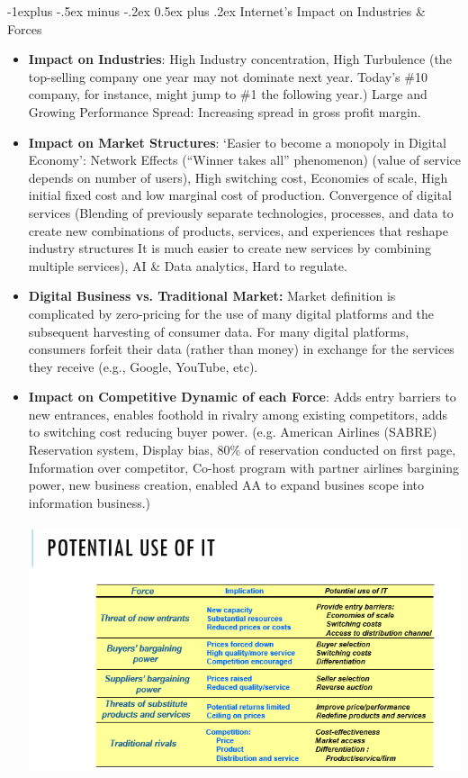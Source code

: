 \documentclass[12pt, landscape]{article}
\makeatletter
\renewcommand{\subsection}{\@startsection{subsection}{2}{0mm}%
                                {-1explus -.5ex minus -.2ex}%
                                {0.5ex plus .2ex}%
                                {\normalfont\normalsize\bfseries}}
\makeatother
\begin{document}
\begin{multicols*}{3}
\subsection{Internet's Impact on Industries \& Forces}
\begin{itemize}
\item \textbf{Impact on Industries}: High Industry concentration, High Turbulence (the top-selling company one year may not dominate next year. Today’s \#10 company, for instance, might jump to \#1 the following year.) Large and Growing Performance Spread: Increasing spread in gross profit margin.
\item \textbf{Impact on Market Structures}: `Easier to become a monopoly in Digital Economy': Network Effects (“Winner takes all” phenomenon) (value of service depends on number of users), High switching cost, Economies of scale, High initial fixed cost and low marginal cost of production. Convergence of digital services (Blending of previously separate technologies, processes, and data to create new combinations of products, services, and experiences that reshape industry structures It is much easier to create new services by combining multiple services), AI \& Data analytics, Hard to regulate.
\item \textbf{Digital Business vs. Traditional Market:} Market definition is complicated by zero-pricing for the use of many digital platforms and the subsequent harvesting of consumer data. For many digital platforms, consumers forfeit their data (rather than money) in exchange for the services they receive (e.g., Google, YouTube, etc).
\item \textbf{Impact on Competitive Dynamic of each Force}:  Adds entry barriers to new entrances, enables foothold in rivalry among existing competitors, adds to switching cost reducing buyer power. (e.g. American Airlines (SABRE) Reservation system, Display bias, 80\% of reservation conducted on first page, Information over competitor, Co-host program with partner airlines bargining power, new business creation, enabled AA to expand busines scope into information business.)
~\\ ~\\
\includegraphics[width = \linewidth]{portersIT}

\end{itemize}
\end{multicols*}
\end{document}
